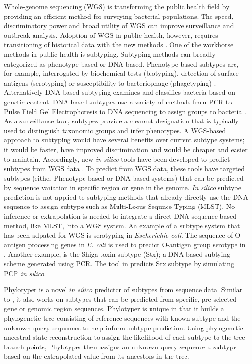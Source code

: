 \documentclass{bioinfo}
\begin{document}
Whole-genome sequencing (WGS) is transforming the public health field by providing an efficient method for surveying bacterial populations.
The speed, discriminatory power and broad utility of WGS can improve surveillance and outbreak analysis.
Adoption of WGS in public health, however, requires transitioning of historical data with the new methods \citep{Jenkins2015}.
One of the workhorse methods in public health is subtyping.
Subtyping methods can broadly categorized as phenotype-based or DNA-based.
Phenotype-based subtypes are, for example, interrogated by biochemical tests (biotyping), detection of surface antigens (serotyping) or susceptibility to bacteriophage (phagetyping) \citep{Wiedmann2002}.
Alternatively DNA-based subtyping examines and classifies bacteria based on genetic content.
DNA-based subtypes use a variety of methods from PCR to Pulse Field Gel Electrophoresis to DNA sequencing to assign groups to bacteria \citep{Wiedmann2002}.
As a surveillance tool, subtypes provide a clearcut designation that is typically used to distinguish taxonomic groups and infer phenotypes.
A WGS-based approach to subtyping would have several benefits over current subtype systems; it would be faster, have improved discrimination and would be cheaper and easier to maintain\citep{Jenkins2015}.
Accordingly, new \textit{in silico} tools have been developed to predict subtypes from WGS data \citep{Joensen2015,Ingle2016,CARRILLO2016}.
To predict from WGS data, these tools have targeted subtypes (either Phenotype-based or DNA-based systems) that can be predicted by sequence variation in specific region or gene in the genome.
\textit{In silico} subtype prediction is not applied to subtyping methods that already directly use the DNA sequence to assign subtype such as Multi-Locus Sequnce Typing (MLST). 
No inference or extrapolation is needed to integrate a direct DNA sequence-based method, like MLST, into a WGS system.
An example of a subtype system that has been adpated for WGS is serotyping in \textit{Escherichia coli}.
The sequence of O-antigen processing genes in \textit{E. coli} is used to predict O-antigen group serotype in \citep{Joensen2015,Ingle2016}.
Another example, is the Shiga toxin subtype (Stx); a DNA-based subtying scheme generated using PCR.
The tool in \citep{CARRILLO2016} predicts Stx subtype by simulating PCR \textit{in silico}.

Phylotyper is a novel \textit{in silico} predictor of subtypes from sequence data.
Similar to \citep{Joensen2015,Ingle2016,CARRILLO2016}, it also works on subtypes that can be predicted from specific, pre-selected gene or genomic region sequences.
Phylotyper is unique in that it builds a phylogenetic tree consisting of reference sequences with known subtype and the unknown query sequences to help inform subtype prediction.
Using phylogenetic ancestral state reconstruction to assign the likelihood of each subtype to the tree branch points, Phylotyper then assigns an unknown query sequence a subtype based on the extrapolated value from its ancestors in the tree.
\end{document}
